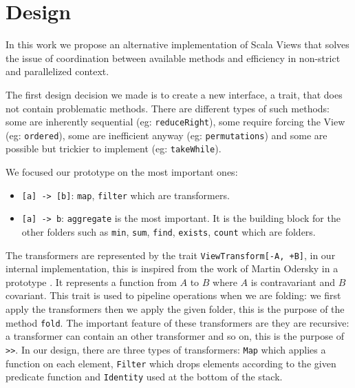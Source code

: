 \documentclass[a4paper,12pt,twocolumn]{article}
\begin{document}

\section{Design}
In this work we propose an alternative implementation of Scala Views that solves the issue of coordination between available methods and efficiency in non-strict and parallelized context.

The first design decision we made is to create a new interface, a trait, that does not contain problematic methods.
There are different types of such methods: some are inherently sequential (eg: \verb|reduceRight|), some require forcing the View (eg: \verb|ordered|), some are inefficient anyway (eg: \verb|permutations|) and some are possible but trickier to implement (eg: \verb|takeWhile|).

We focused our prototype on the most important ones:
\begin{itemize}
    \item \verb|[a] -> [b]|: \verb|map|, \verb|filter| which are transformers.
    \item \verb|[a] -> b|: \verb|aggregate| is the most important. It is the building block for the other folders such as \verb|min|, \verb|sum|, \verb|find|, \verb|exists|, \verb|count| which are folders.
\end{itemize}

The transformers are represented by the trait \verb|ViewTransform[-A, +B]|, in our internal implementation, this is inspired from the work of Martin Odersky in a prototype \cite{martin-view-prototype}.
It represents a function from $A$ to $B$ where $A$ is contravariant and $B$ covariant.
This trait is used to pipeline operations when we are folding: we first apply the transformers then we apply the given folder, this is the purpose of the method \verb|fold|.
The important feature of these transformers are they are recursive: a transformer can contain an other transformer and so on, this is the purpose of \verb|>>|.
In our design, there are three types of transformers: \verb|Map| which applies a function on each element, \verb|Filter| which drops elements according to the given predicate function and \verb|Identity| used at the bottom of the stack.
\end{document}
